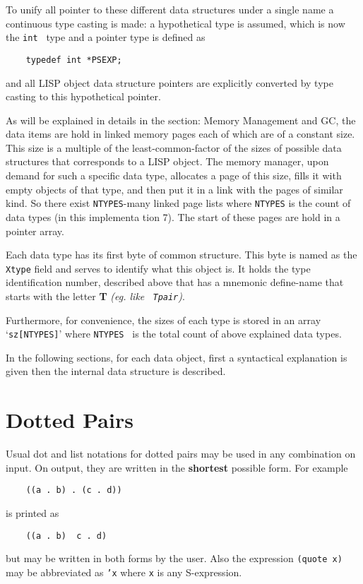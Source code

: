 To unify all pointer to these different data  structures  under  a
single name a continuous type casting is made: a hypothetical type is assumed,
which is now the {\tt int } type and a pointer type is defined as
\begin{verbatim}
    typedef int *PSEXP;
\end{verbatim}
and  all  LISP  object  data structure pointers are explicitly converted by
type casting to this hypothetical pointer.


As will be explained in details in the section: Memory Management  and  GC,
the  data  items  are  hold  in  linked memory pages each of which are of a
constant size. This size is a multiple of the  least-common-factor  of  the
sizes  of  possible  data structures that corresponds to a LISP object. The
memory manager, upon demand for such a  specific  data  type,  allocates  a
page  of  this size, fills it with empty objects of that type, and then put
it in a link with the pages of similar kind. So there exist {\tt NTYPES}-many
linked
page lists where {\tt NTYPES} is the count of data  types  (in  this  implementa
tion
7). The start of these pages are hold in a pointer array.

Each  data  type has its first byte of common structure. This byte is named
as the {\tt Xtype} field and serves to identify what  this  object  is.  It
holds  the  type identification number, described above that has a mnemonic
define-name that starts with  the  letter  {\bf  T}  {\em  (eg.  like  {\tt
Tpair})}.

Furthermore,  for convenience, the sizes of each type is stored in an array
`{\tt sz[NTYPES]}' where  {\tt  NTYPES  }  is  the  total  count  of  above
explained data types.

In  the  following  sections,  for  each  data  object, first a syntactical
explanation is given then the internal data structure is described.

\section{Dotted Pairs}
Usual dot and  list   notations  for  dotted  pairs  may  be  used  in  any
combination  on  input.  On  output, they are written in the {\bf shortest}
possible form. For example
\begin{verbatim}
    ((a . b) . (c . d))
\end{verbatim}
is printed as
\begin{verbatim}
    ((a . b)  c . d)
\end{verbatim}
but may be written in both forms by the user. Also the expression
\mbox{{\tt (quote x)}} may be abbreviated as {\tt 'x} where {\tt x}  is any
S-expression.

